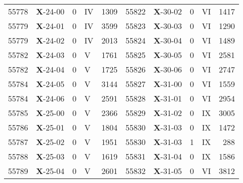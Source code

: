 \begin{table*}
\begin{tabular}{llllrllllr}
55778&\textbf{X}-24-00&0&IV&1309&55822&\textbf{X}-30-02&0&VI&1417\\
55779&\textbf{X}-24-01&0&IV&3599&55823&\textbf{X}-30-03&0&VI&1290\\
55779&\textbf{X}-24-02&0&IV&2013&55824&\textbf{X}-30-04&0&VI&1489\\
55782&\textbf{X}-24-03&0&V&1761&55825&\textbf{X}-30-05&0&VI&2581\\
55782&\textbf{X}-24-04&0&V&1725&55826&\textbf{X}-30-06&0&VI&2747\\
55784&\textbf{X}-24-05&0&V&3144&55827&\textbf{X}-31-00&0&VI&1559\\
55784&\textbf{X}-24-06&0&V&2591&55828&\textbf{X}-31-01&0&VI&2954\\
55785&\textbf{X}-25-00&0&V&2366&55829&\textbf{X}-31-02&0&IX&3005\\
55786&\textbf{X}-25-01&0&V&1804&55830&\textbf{X}-31-03&0&IX&1472\\
55787&\textbf{X}-25-02&0&V&1951&55830&\textbf{X}-31-03&1&IX&288\\
55788&\textbf{X}-25-03&0&V&1619&55831&\textbf{X}-31-04&0&IX&1586\\
55789&\textbf{X}-25-04&0&V&2601&55832&\textbf{X}-31-05&0&VI&3812\\
\hline
\hline
\end{tabular}
\end{table*}

